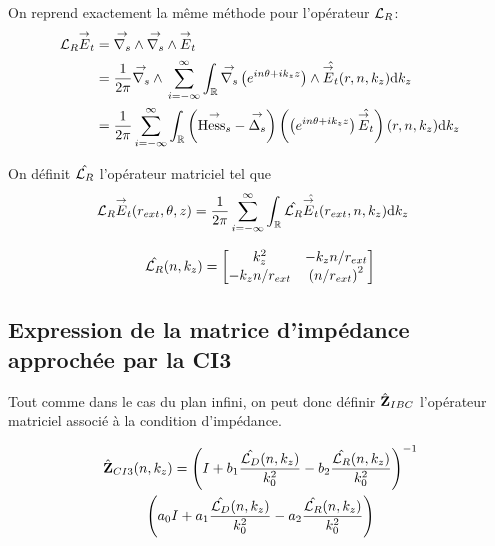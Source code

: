     On reprend exactement la même méthode pour l'opérateur \({\mathcal{L}_R}\):
    \begin{align}
      {\mathcal{L}_R} {\overset{\rightarrow}{E}}_t & = {\overset{\rightarrow}{\nabla_s}} \wedge{} {\overset{\rightarrow}{\nabla_s}} \wedge{} {\overset{\rightarrow}{E}}_t
      \\
      &=\dfrac{1}{2\pi}{\overset{\rightarrow}{\nabla_s}} \wedge{}\sum_{i=-\infty}^\infty\int_\mathbb R {\overset{\rightarrow}{\nabla_s}}{}\left(e^{in\theta + ik_zz}\right) \wedge \hat{{\overset{\rightarrow}{E}}_t}(r,n,k_z)\mathrm{d}{k_z}
      \\
      &= \dfrac{1}{2\pi}\sum_{i=-\infty}^\infty \int_\mathbb R \left({\overset{\rightarrow}{\operatorname{Hess}_s}} - {\overset{\rightarrow}{\Delta_s}}\right) \left(\left(e^{in\theta + ik_zz}\right) \hat{{\overset{\rightarrow}{E}}_t}\right)(r,n,k_z)\mathrm{d}{k_z}
    \end{align}

    On définit \(\hat{{\mathcal{L}_R}}\) l'opérateur matriciel tel que
    \begin{align}
      {\mathcal{L}_R} {\overset{\rightarrow}{E}}_t(r_{ext},\theta,z)
      &= \dfrac{1}{2\pi}\sum_{i=-\infty}^\infty\int_\mathbb R \hat{{\mathcal{L}_R}} \hat{{\overset{\rightarrow}{E}}_t}(r_{ext},n,k_z)\mathrm{d}{k_z}
    \end{align}

    \begin{equation}
      \hat{{\mathcal{L}_R}}(n,k_z) =
      \begin{bmatrix}
        k_z^2 & -k_z{n}\slash{r_{ext}}
        \\
        -k_z{n}\slash{r_{ext}} & \left({n}\slash{r_{ext}} \right)^2
      \end{bmatrix}
    \end{equation}

  \subsection{Expression de la matrice d'impédance approchée par la CI3}

    Tout comme dans le cas du plan infini, on peut donc définir \(\hat{\mathbf{Z}}_{IBC}\) l’opérateur matriciel associé à la condition d'impédance.

    \begin{multline}
        \hat{\mathbf{Z}}_{CI3}(n,k_z) = \left(I + b_1 \dfrac{\hat{{\mathcal{L}_D}}(n,k_z)}{k_0^2} - b_2 \dfrac{\hat{{\mathcal{L}_R}}(n,k_z)}{k_0^2} \right)^{-1}\\
        \left(a_0 I + a_1 \dfrac{\hat{{\mathcal{L}_D}}(n,k_z)}{k_0^2} - a_2 \dfrac{\hat{{\mathcal{L}_R}}(n,k_z)}{k_0^2}\right)
    \end{multline}
